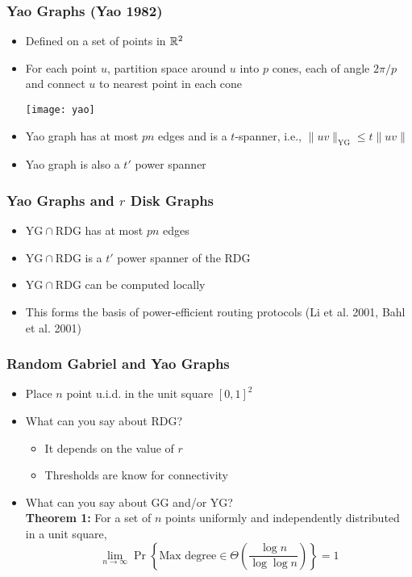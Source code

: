 \documentclass{beamer}
\newcommand{\GG}{\mathrm{GG}}
\newcommand{\YG}{\mathrm{YG}}
\newcommand{\RDG}{\mathrm{RDG}}
\begin{document}
\frame
{
  \frametitle{Yao Graphs (Yao 1982)}
  \begin{itemize}
    \item Defined on a set of points in $\mathbb{R}^2$
    \item For each point $u$, partition space around $u$ into $p$ cones,
           each of angle $2\pi/p$ and connect $u$ to nearest point in each cone
    \begin{center}
      \texttt{[image: yao]}
    \end{center}
    \item Yao graph has at most $pn$ edges and is a $t$-spanner, i.e., 
       $\|uv\|_{\YG} \le t\|uv\|$
    \item Yao graph is also a $t'$ power spanner
  \end{itemize}
}

\frame
{
  \frametitle{Yao Graphs and $r$ Disk Graphs}
  \begin{itemize}
    \item $\YG\cap\RDG$ has at most $pn$ edges
    \item $\YG\cap\RDG$ is a $t'$ power spanner of the $\RDG$
    \item $\YG\cap\RDG$ can be computed locally
    \item This forms the basis of power-efficient routing protocols
          (Li et al. 2001, Bahl et al. 2001)
  \end{itemize}
}

\frame
{
  \frametitle{Random Gabriel and Yao Graphs}
  \begin{itemize}
    \item Place $n$ point u.i.d. in the unit square $[0,1]^2$
    \item What can you say about $\RDG$?
      \begin{itemize}
        \item It depends on the value of $r$
        \item Thresholds are know for connectivity
       \end{itemize}
    \item What can you say about $\GG$ and/or $\YG$? \\
          \textbf{Theorem 1:}
           For a set of $n$ points uniformly and independently distributed
		in a unit square, 
           \[\lim_{n\rightarrow\infty}
              \Pr\left\{\mbox{Max degree} \in \Theta\left(\frac{\log
n}{\log\log n}\right)\right\} = 1 \]
  \end{itemize}
}
\end{document}
